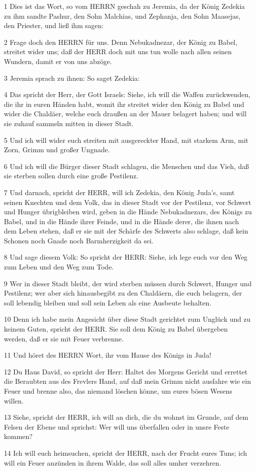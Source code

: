 \par 1 Dies ist das Wort, so vom HERRN geschah zu Jeremia, da der König Zedekia zu ihm sandte Pashur, den Sohn Malchias, und Zephanja, den Sohn Maasejas, den Priester, und ließ ihm sagen:
\par 2 Frage doch den HERRN für uns. Denn Nebukadnezar, der König zu Babel, streitet wider uns; daß der HERR doch mit uns tun wolle nach allen seinen Wundern, damit er von uns abzöge.
\par 3 Jeremia sprach zu ihnen: So saget Zedekia:
\par 4 Das spricht der Herr, der Gott Israels: Siehe, ich will die Waffen zurückwenden, die ihr in euren Händen habt, womit ihr streitet wider den König zu Babel und wider die Chaldäer, welche euch draußen an der Mauer belagert haben; und will sie zuhauf sammeln mitten in dieser Stadt.
\par 5 Und ich will wider euch streiten mit ausgereckter Hand, mit starkem Arm, mit Zorn, Grimm und großer Ungnade.
\par 6 Und ich will die Bürger dieser Stadt schlagen, die Menschen und das Vieh, daß sie sterben sollen durch eine große Pestilenz.
\par 7 Und darnach, spricht der HERR, will ich Zedekia, den König Juda's, samt seinen Knechten und dem Volk, das in dieser Stadt vor der Pestilenz, vor Schwert und Hunger übrigbleiben wird, geben in die Hände Nebukadnezars, des Königs zu Babel, und in die Hände ihrer Feinde, und in die Hände derer, die ihnen nach dem Leben stehen, daß er sie mit der Schärfe des Schwerts also schlage, daß kein Schonen noch Gnade noch Barmherzigkeit da sei.
\par 8 Und sage diesem Volk: So spricht der HERR: Siehe, ich lege euch vor den Weg zum Leben und den Weg zum Tode.
\par 9 Wer in dieser Stadt bleibt, der wird sterben müssen durch Schwert, Hunger und Pestilenz; wer aber sich hinausbegibt zu den Chaldäern, die euch belagern, der soll lebendig bleiben und soll sein Leben als eine Ausbeute behalten.
\par 10 Denn ich habe mein Angesicht über diese Stadt gerichtet zum Unglück und zu keinem Guten, spricht der HERR. Sie soll dem König zu Babel übergeben werden, daß er sie mit Feuer verbrenne.
\par 11 Und höret des HERRN Wort, ihr vom Hause des Königs in Juda!
\par 12 Du Haus David, so spricht der Herr: Haltet des Morgens Gericht und errettet die Beraubten aus des Frevlers Hand, auf daß mein Grimm nicht ausfahre wie ein Feuer und brenne also, das niemand löschen könne, um eures bösen Wesens willen.
\par 13 Siehe, spricht der HERR, ich will an dich, die du wohnst im Grunde, auf dem Felsen der Ebene und sprichst: Wer will uns überfallen oder in unsre Feste kommen?
\par 14 Ich will euch heimsuchen, spricht der HERR, nach der Frucht eures Tuns; ich will ein Feuer anzünden in ihrem Walde, das soll alles umher verzehren.

